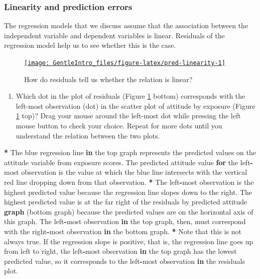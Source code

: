\documentclass[a4paper]{book}
\newenvironment{Shaded}{\begin{snugshade}}{\end{snugshade}}
\newcommand{\KeywordTok}[1]{\textcolor[rgb]{0,0,0}{\textbf{#1}}}
\newcommand{\StringTok}[1]{\textcolor[rgb]{0.00,0.00,0.00}{#1}}
\newcommand{\ControlFlowTok}[1]{\textcolor[rgb]{0.00,0.00,0.00}{\textbf{#1}}}
\newcommand{\OperatorTok}[1]{\textcolor[rgb]{0.00,0.00,0.00}{\textbf{#1}}}
\newcommand{\NormalTok}[1]{#1}
\providecommand{\tightlist}{%
  \setlength{\itemsep}{0pt}\setlength{\parskip}{0pt}}
\theoremstyle{definition}
\theoremstyle{definition}
\theoremstyle{definition}
\theoremstyle{remark}
\begin{document}
\subsubsection{Linearity and prediction
errors}\label{linearity-and-prediction-errors}

The regression models that we discuss assume that the association
between the independent variable and dependent variables is linear.
Residuals of the regression model help us to see whether this is the
case.

\begin{figure}[H]
\href{http://82.196.4.233:3838/apps/pred-linearity/}{\texttt{[image: GentleIntro\_files/figure-latex/pred-linearity-1]} }\caption{How do residuals tell us whether the relation is linear?}\label{fig:pred-linearity}
\end{figure}

\begin{enumerate}
\def\labelenumi{\arabic{enumi}.}
\tightlist
\item
  Which dot in the plot of residuals (Figure \ref{fig:pred-linearity}
  bottom) corresponds with the left-most observation (dot) in the
  scatter plot of attitude by exposure (Figure \ref{fig:pred-linearity}
  top)? Drag your mouse around the left-most dot while pressing the left
  mouse button to check your choice. Repeat for more dots until you
  understand the relation between the two plots.
\end{enumerate}

\begin{Shaded}
\begin{Highlighting}[]
\OperatorTok{*}\StringTok{ }\NormalTok{The blue regression line }\ControlFlowTok{in}\NormalTok{ the top graph represents the predicted values on}
\NormalTok{the attitude variable from exposure scores. The predicted attitude value }\ControlFlowTok{for}
\NormalTok{the left}\OperatorTok{-}\NormalTok{most observation is the value at which the blue line intersects with}
\NormalTok{the vertical red line dropping down from that observation.}
\OperatorTok{*}\StringTok{ }\NormalTok{The left}\OperatorTok{-}\NormalTok{most observation is the highest predicted value because the}
\NormalTok{regression line slopes down to the right. The highest predicted value is at}
\NormalTok{the far right of the residuals by predicted attitude }\KeywordTok{graph}\NormalTok{ (bottom graph)}
\NormalTok{because the predicted values are on the horizontal axis of this graph. The}
\NormalTok{left}\OperatorTok{-}\NormalTok{most observation }\ControlFlowTok{in}\NormalTok{ the top graph, then, must correspond with the}
\NormalTok{right}\OperatorTok{-}\NormalTok{most observation }\ControlFlowTok{in}\NormalTok{ the bottom graph.}
\OperatorTok{*}\StringTok{ }\NormalTok{Note that this is not always true. If the regression slope is positive, that}
\NormalTok{is, the regression line goes up from left to right, the left}\OperatorTok{-}\NormalTok{most observation}
\ControlFlowTok{in}\NormalTok{ the top graph has the lowest predicted value, so it corresponds to the}
\NormalTok{left}\OperatorTok{-}\NormalTok{most observation }\ControlFlowTok{in}\NormalTok{ the residuals plot.}
\end{Highlighting}
\end{Shaded}
\end{document}
